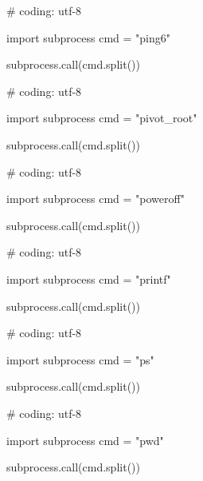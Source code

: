 \begin{mylisting}[label={lst:acpid},language=sh,caption=ping6]

# coding: utf-8

import subprocess
cmd = "ping6"

subprocess.call(cmd.split())

\end{mylisting}

\begin{mylisting}[label={lst:acpid},language=sh,caption=pivot\_root]

# coding: utf-8

import subprocess
cmd = "pivot\_root"

subprocess.call(cmd.split())

\end{mylisting}

\begin{mylisting}[label={lst:acpid},language=sh,caption=poweroff]

# coding: utf-8

import subprocess
cmd = "poweroff"

subprocess.call(cmd.split())

\end{mylisting}

\begin{mylisting}[label={lst:acpid},language=sh,caption=printf]

# coding: utf-8

import subprocess
cmd = "printf"

subprocess.call(cmd.split())

\end{mylisting}

\begin{mylisting}[label={lst:acpid},language=sh,caption=ps]

# coding: utf-8

import subprocess
cmd = "ps"

subprocess.call(cmd.split())

\end{mylisting}

\begin{mylisting}[label={lst:acpid},language=sh,caption=pwd]

# coding: utf-8

import subprocess
cmd = "pwd"

subprocess.call(cmd.split())

\end{mylisting}

